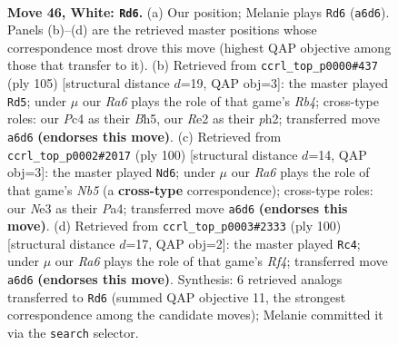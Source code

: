 \documentclass[11pt]{article}
\begin{document}
\clearpage

\begin{figure}[p]\centering
\begin{subfigure}{0.46\textwidth}\centering
\resizebox{\linewidth}{!}{%
\newchessgame
\chessboard[
  setfen={7k/1r4b1/R7/8/2P4K/4N3/4R3/8 w - - 12 46},
  showmover=false,
  pgfstyle=straightmove, color=movearrow, markmove={a6-d6}
]}
\caption{}
\end{subfigure}\hfill
\begin{subfigure}{0.46\textwidth}\centering
\resizebox{\linewidth}{!}{%
\newchessgame
\chessboard[
  setfen={8/4k3/8/1r5b/3B4/2K5/7P/5R2 b - - 14 53},
  showmover=false,
  pgfstyle=straightmove, color=movearrow, markmove={b5-d5}
]}
\caption{}
\end{subfigure}
\\[4pt]
\begin{subfigure}{0.46\textwidth}\centering
\resizebox{\linewidth}{!}{%
\newchessgame
\chessboard[
  setfen={5k2/1p4b1/8/1N1R4/P7/5r2/8/6K1 w - - 7 51},
  showmover=false,
  pgfstyle=straightmove, color=movearrow, markmove={b5-d6}
]}
\caption{}
\end{subfigure}\hfill
\begin{subfigure}{0.46\textwidth}\centering
\resizebox{\linewidth}{!}{%
\newchessgame
\chessboard[
  setfen={8/8/2k5/2b1r3/5R2/3K1P2/8/8 w - - 0 51},
  showmover=false,
  pgfstyle=straightmove, color=movearrow, markmove={f4-c4}
]}
\caption{}
\end{subfigure}
\caption{\textbf{Move 46, White: \texttt{Rd6}.} (a) Our position; Melanie plays \texttt{Rd6} (\texttt{a6d6}). Panels (b)--(d) are the retrieved master positions whose correspondence most drove this move (highest QAP objective among those that transfer to it). (b) Retrieved from \texttt{ccrl\_top\_p0000\#437} (ply 105) [structural distance $d$=19, QAP obj=3]: the master played \texttt{Rd5}; under $\mu$ our \emph{Ra6} plays the role of that game's \emph{Rb4}; cross-type roles: our \emph{P}c4 as their \emph{B}h5, our \emph{R}e2 as their \emph{p}h2; transferred move \texttt{a6d6} \textbf{(endorses this move)}. (c) Retrieved from \texttt{ccrl\_top\_p0002\#2017} (ply 100) [structural distance $d$=14, QAP obj=3]: the master played \texttt{Nd6}; under $\mu$ our \emph{Ra6} plays the role of that game's \emph{Nb5} (a \textbf{cross-type} correspondence); cross-type roles: our \emph{N}e3 as their \emph{P}a4; transferred move \texttt{a6d6} \textbf{(endorses this move)}. (d) Retrieved from \texttt{ccrl\_top\_p0003\#2333} (ply 100) [structural distance $d$=17, QAP obj=2]: the master played \texttt{Rc4}; under $\mu$ our \emph{Ra6} plays the role of that game's \emph{Rf4}; transferred move \texttt{a6d6} \textbf{(endorses this move)}. Synthesis: 6 retrieved analogs transferred to \texttt{Rd6} (summed QAP objective 11, the strongest correspondence among the candidate moves); Melanie committed it via the \texttt{search} selector.}
\label{fig:thought-m90}
\end{figure}
\end{document}
